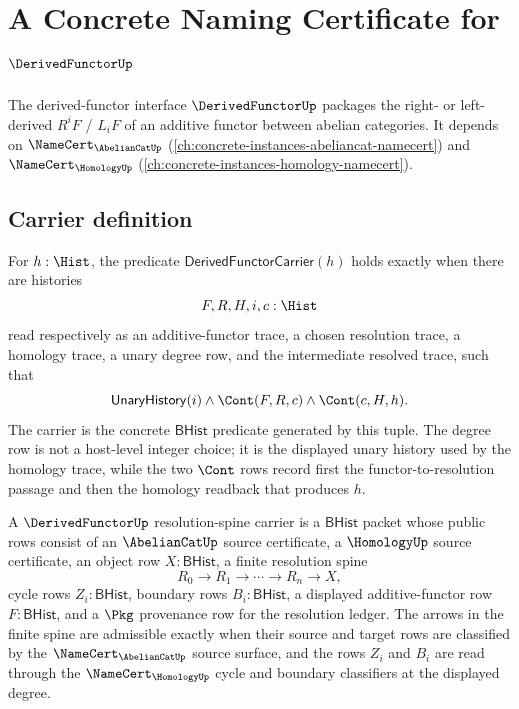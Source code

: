 \chapter{A Concrete Naming Certificate for $\DerivedFunctorUp$}
\label{ch:concrete-instances-derivedfunctor-namecert}

The derived-functor interface $\DerivedFunctorUp$ packages the right- or left-derived $R^iF$ / $L_iF$ of an additive functor between abelian categories. It depends on $\NameCert_{\AbelianCatUp}$ (\autoref{ch:concrete-instances-abeliancat-namecert}) and $\NameCert_{\HomologyUp}$ (\autoref{ch:concrete-instances-homology-namecert}).

\section{Carrier definition}
\label{sec:derivedfunctor-carrier}

\begin{definition}\label{def:derivedfunctor-carrier}
For $h:\Hist$, the predicate $\mathsf{DerivedFunctorCarrier}(h)$ holds exactly when there are histories
$$
F,R,H,i,c:\Hist
$$
read respectively as an additive-functor trace, a chosen resolution trace, a homology trace, a unary degree row, and the intermediate resolved trace, such that
$$
\mathsf{UnaryHistory}(i)\wedge \Cont(F,R,c)\wedge \Cont(c,H,h).
$$
The carrier is the concrete $\mathsf{BHist}$ predicate generated by this tuple. The degree row is not a host-level integer choice; it is the displayed unary history used by the homology trace, while the two $\Cont$ rows record first the functor-to-resolution passage and then the homology readback that produces $h$.
\end{definition}

\begin{definition}\label{def:derivedfunctor-resolution-spine-carrier}
A $\DerivedFunctorUp$ resolution-spine carrier is a $\mathsf{BHist}$ packet whose public rows consist of an $\AbelianCatUp$ source certificate, a $\HomologyUp$ source certificate, an object row $X:\mathsf{BHist}$, a finite resolution spine
$$
R_0\to R_1\to \cdots \to R_n\to X,
$$
cycle rows $Z_i:\mathsf{BHist}$, boundary rows $B_i:\mathsf{BHist}$, a displayed additive-functor row $F:\mathsf{BHist}$, and a $\Pkg$ provenance row for the resolution ledger. The arrows in the finite spine are admissible exactly when their source and target rows are classified by the $\NameCert_{\AbelianCatUp}$ source surface, and the rows $Z_i$ and $B_i$ are read through the $\NameCert_{\HomologyUp}$ cycle and boundary classifiers at the displayed degree.
\end{definition}

